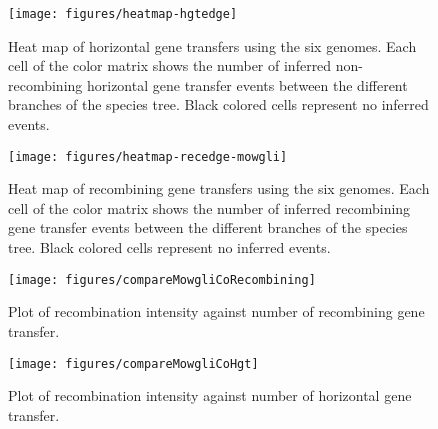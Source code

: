 \documentclass[10pt]{article}
\begin{document}
\begin{figure}
\begin{center}
\texttt{[image: figures/heatmap-hgtedge]}
\end{center}
\caption{\label{fig:hgt-heatmap}Heat map of horizontal gene transfers using the
six genomes.
Each cell of the color matrix shows the number of inferred non-recombining
horizontal gene transfer events between the different branches of the species
tree. Black colored cells represent no inferred events.}
\end{figure}
\clearpage{}%

\begin{figure}
\begin{center}
\texttt{[image: figures/heatmap-recedge-mowgli]}
\end{center}
\caption{\label{fig:mowgli-recomb-heatmap}Heat map of recombining gene transfers using the
six genomes.
Each cell of the color matrix shows the number of inferred recombining
gene transfer events between the different branches of the species
tree. Black colored cells represent no inferred events.}
\end{figure}
\clearpage{}

\begin{figure}
\begin{center}
\texttt{[image: figures/compareMowgliCoRecombining]}
\end{center}
\caption{\label{fig:cmpcomowgli}Plot of recombination intensity against number
of recombining gene transfer.}
\end{figure}
\clearpage{}

\begin{figure}
\begin{center}
\texttt{[image: figures/compareMowgliCoHgt]}
\end{center}
\caption{\label{fig:cmpcomowglihgt}Plot of recombination intensity against number
of horizontal gene transfer.}
\end{figure}
\clearpage{}
\end{document}
